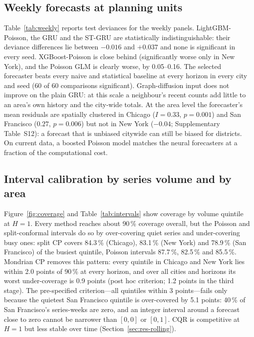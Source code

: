\documentclass[preprint,12pt,authoryear]{elsarticle}
\begin{document}
\subsection{Weekly forecasts at planning units}\label{sec:res-weekly}
Table~\ref{tab:weekly} reports test deviances for the weekly panels. LightGBM-Poisson, the GRU and the ST-GRU are statistically indistinguishable: their deviance differences lie between $-0.016$ and $+0.037$ and none is significant in every seed. XGBoost-Poisson is close behind (significantly worse only in New York), and the Poisson GLM is clearly worse, by 0.05--0.16. The selected forecaster beats every naive and statistical baseline at every horizon in every city and seed (60 of 60 comparisons significant). Graph-diffusion input does not improve on the plain GRU: at this scale a neighbour's recent counts add little to an area's own history and the city-wide totals. At the area level the forecaster's mean residuals are spatially clustered in Chicago ($I=0.33$, $p=0.001$) and San Francisco ($0.27$, $p=0.006$) but not in New York ($-0.04$; Supplementary Table~S12): a forecast that is unbiased citywide can still be biased for districts. On current data, a boosted Poisson model matches the neural forecasters at a fraction of the computational cost.



\subsection{Interval calibration by series volume and by area}\label{sec:res-intervals}
Figure~\ref{fig:coverage} and Table~\ref{tab:intervals} show coverage by volume quintile at $H=1$. Every method reaches about 90\,\% coverage overall, but the Poisson and split-conformal intervals do so by over-covering quiet series and under-covering busy ones: split CP covers 84.3\,\% (Chicago), 83.1\,\% (New York) and 78.9\,\% (San Francisco) of the busiest quintile, Poisson intervals 87.7\,\%, 82.5\,\% and 85.5\,\%. Mondrian CP removes this pattern: every quintile in Chicago and New York lies within 2.0 points of 90\,\% at every horizon, and over all cities and horizons its worst under-coverage is 0.9 points (post hoc criterion; 1.2 points in the third stage). The pre-specified criterion---all quintiles within 3 points---fails only because the quietest San Francisco quintile is over-covered by 5.1 points: 40\,\% of San Francisco's series-weeks are zero, and an integer interval around a forecast close to zero cannot be narrower than $[0,0]$ or $[0,1]$. CQR is competitive at $H=1$ but less stable over time (Section~\ref{sec:res-rolling}).
\end{document}
